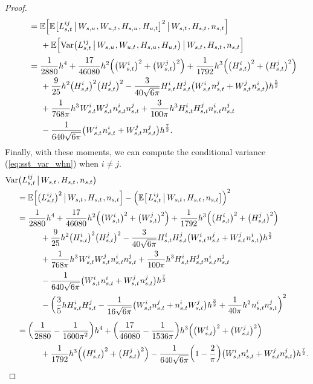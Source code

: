 \documentclass[sn-mathphys-num]{sn-jnl}%
\newcommand{\E}{\mathbb{E}}
\newcommand{\m}{\hspace{0.25mm}}
\newcommand{\mm}{\hspace{5mm}}
\newcommand{\mmm}{\hspace{10mm}}
\newcommand{\mmmm}{\hspace{15mm}}
\newcommand{\var}{\mathrm{Var}}
\begin{document}
\begin{proof}
\begin{align*}
&\mm = \E\Big[\E\big[L_{s,t}^{ij}\,\big|\, W_{s,u}\m, W_{u,t}\m, H_{s,u}\m, H_{u,t}\big]^2\,\big|\, W_{s,t}\m, H_{s,t}\m, n_{s,t}\Big]\\
&\mmm + \E\Big[\var\big(L_{s,t}^{ij}\,\big|\, W_{s,u}\m, W_{u,t}\m, H_{s,u}\m, H_{u,t}\big)\,\big|\, W_{s,t}\m, H_{s,t}\m, n_{s,t}\Big]\\[1pt]
&\mm = \frac{1}{2880}h^4 + \frac{17}{46080}h^2 \Big(\big(W_{s,t}^i\big)^2 + \big(W_{s,t}^j\big)^2\Big) + \frac{1}{1792}h^3 \Big(\big(H_{s,t}^i\big)^2 + \big(H_{s,t}^j\big)^2\Big)\\
&\mmm + \frac{9}{25}h^2\big(H_{s,t}^i\big)^2\big(H_{s,t}^j\big)^2 - \frac{3}{40\sqrt{6\pi}}H_{s,t}^i H_{s,t}^j \big(W_{s,t}^i \m n_{s,t}^j +  W_{s,t}^j \m n_{s,t}^i\big) h^\frac{5}{2}\\
&\mmm + \frac{1}{768\pi}h^3\m W_{s,t}^i W_{s,t}^j\m n_{s,t}^i n_{s,t}^j + \frac{3}{100\pi}h^3 H_{s,t}^i H_{s,t}^j n_{s,t}^i n_{s,t}^j\\[2pt]
&\mmm - \frac{1}{640\sqrt{6\pi}}\big(W_{s,t}^i\m n_{s,t}^i +  W_{s,t}^j\m n_{s,t}^j\big)h^\frac{7}{2}.
\end{align*}
Finally, with these moments, we can compute the conditional variance (\ref{eq:sst_var_whn}) when $i\neq j$.
\begin{align*}
&\var\big(L_{s,t}^{ij}\,\big|\, W_{s,t}\m, H_{s,t}\m, n_{s,t}\big)\\
&\mm = \E\Big[\big(L_{s,t}^{ij}\big)^2\,\big|\, W_{s,t}\m, H_{s,t}\m, n_{s,t}\Big] - \Big(\E\big[\m L_{s,t}^{ij}\,\big|\, W_{s,t}\m, H_{s,t}\m, n_{s,t}\big]\Big)^2\\[1pt]
&\mm = \frac{1}{2880}h^4 + \frac{17}{46080}h^2 \Big(\big(W_{s,t}^i\big)^2 + \big(W_{s,t}^j\big)^2\Big) + \frac{1}{1792}h^3 \Big(\big(H_{s,t}^i\big)^2 + \big(H_{s,t}^j\big)^2\Big)\\
&\mmmm + \frac{9}{25}h^2\big(H_{s,t}^i\big)^2\big(H_{s,t}^j\big)^2 - \frac{3}{40\sqrt{6\pi}}H_{s,t}^i H_{s,t}^j \big(W_{s,t}^i \m n_{s,t}^j +  W_{s,t}^j \m n_{s,t}^i\big) h^\frac{5}{2}\\
&\mmmm + \frac{1}{768\pi}h^3\m W_{s,t}^i W_{s,t}^j\m n_{s,t}^i n_{s,t}^j + \frac{3}{100\pi}h^3 H_{s,t}^i H_{s,t}^j n_{s,t}^i n_{s,t}^j\\[2pt]
&\mmmm - \frac{1}{640\sqrt{6\pi}}\big(W_{s,t}^i\m n_{s,t}^i +  W_{s,t}^j\m n_{s,t}^j\big)h^\frac{7}{2}\\
&\mmmm - \bigg(\frac{3}{5}h H_{s,t}^i H_{s,t}^j - \frac{1}{16\sqrt{6\pi}}\big(W_{s,t}^i n_{s,t}^j + n_{s,t}^i W_{s,t}^j\big)h^\frac{3}{2} + \frac{1}{40\pi}h^2\m n_{s,t}^i n_{s,t}^j\bigg)^2\\[3pt]
&\mm = \bigg(\frac{1}{2880} - \frac{1}{1600\pi^2}\bigg) h^4 + \bigg(\frac{17}{46080} - \frac{1}{1536\pi}\bigg)h^3\Big(\big(W_{s,t}^i\big)^2 + \big(W_{s,t}^j\big)^2\Big)\\
&\mmmm  + \frac{1}{1792}h^3\Big(\big(H_{s,t}^i\big)^2 + \big(H_{s,t}^j\big)^2\Big) - \frac{1}{640\sqrt{6\pi}}\bigg(1 - \frac{2}{\pi}\bigg)\big(W_{s,t}^i n_{s,t}^i +W_{s,t}^j n_{s,t}^j\big)h^\frac{7}{2}.
\end{align*}
\end{proof}
\end{document}
